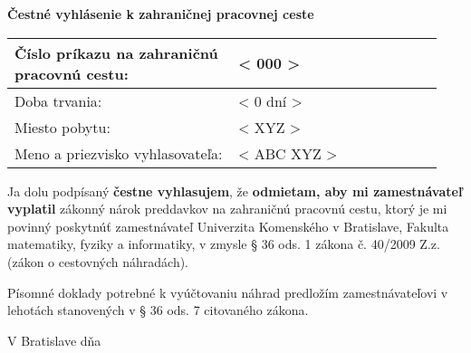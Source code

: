 \documentclass[12pt,a4paper]{article}
\newcommand{\placeholder}[1]{< #1 >}
\newcommand{\orderNumber}{\placeholder{000}}
\newcommand{\tripDuration}{\placeholder{0 dní}}
\newcommand{\address}{\placeholder{XYZ}}
\newcommand{\name}{\placeholder{ABC XYZ}}
\begin{document}
\vspace*{0.2cm}

\begin{center}
	\large{\bf Čestné vyhlásenie k zahraničnej pracovnej ceste}
\end{center}

\bgroup
\def\arraystretch{2}
\begin{table}[h]
\centering
\begin{tabular}{|p{0.49\linewidth}|p{0.455\linewidth}|}
	\hline
	Číslo príkazu na zahraničnú pracovnú cestu: & \orderNumber  \\ \hline
	Doba trvania:                               & \tripDuration \\ \hline
	Miesto pobytu:                              & \address 		\\ \hline
	Meno a priezvisko vyhlasovateľa:            & \name 		\\ \hline
\end{tabular}
\end{table}
\egroup

\vspace*{2.2cm}

{

Ja dolu podpísaný {\bf čestne vyhlasujem}, že {\bf odmietam, aby mi zamestnávateľ vyplatil} zákonný nárok preddavkov na zahraničnú pracovnú cestu, ktorý je mi povinný poskytnúť zamestnávateľ Univerzita Komenského v Bratislave, Fakulta matematiky, \linebreak fyziky a informatiky, v zmysle § 36 ods. 1 zákona č. 40/2009 Z.z. (zákon o cestovných náhradách).

Písomné doklady potrebné k vyúčtovaniu náhrad predložím zamestnávateľovi \linebreak v lehotách stanovených v § 36 ods. 7 citovaného zákona.

}

\vspace*{1cm}

V Bratislave dňa

\vspace*{1cm}

\par\hfill\noindent\makebox[2.5in]{\hrulefill}
\par\hfill\noindent{}  
\end{document}

